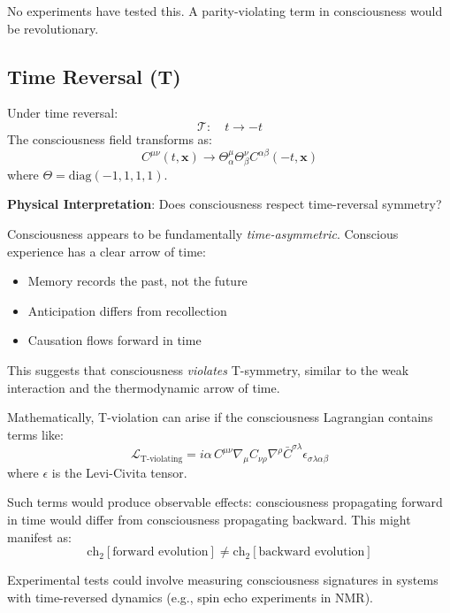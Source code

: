 No experiments have tested this. A parity-violating term in consciousness would be revolutionary.

\subsection{Time Reversal (T)}

\begin{definition}\label{def:t-symmetry-consciousness}
Under time reversal:
\begin{equation}
\mathcal{T}: \quad t \to -t
\end{equation}
The consciousness field transforms as:
\begin{equation}
C^{\mu\nu}(t, \mathbf{x}) \to \Theta^\mu_\alpha \Theta^\nu_\beta C^{\alpha\beta}(-t, \mathbf{x})
\end{equation}
where $\Theta = \text{diag}(-1, 1, 1, 1)$.
\end{definition}

\textbf{Physical Interpretation}: Does consciousness respect time-reversal symmetry?

\begin{level3}
Consciousness appears to be fundamentally \textit{time-asymmetric}. Conscious experience has a clear arrow of time:
\begin{itemize}
\item Memory records the past, not the future
\item Anticipation differs from recollection
\item Causation flows forward in time
\end{itemize}

This suggests that consciousness \textit{violates} T-symmetry, similar to the weak interaction and the thermodynamic arrow of time.

Mathematically, T-violation can arise if the consciousness Lagrangian contains terms like:
\begin{equation}
\mathcal{L}_{\text{T-violating}} = i \alpha \, C^{\mu\nu} \nabla_\mu C_{\nu\rho} \nabla^\rho \bar{C}^{\sigma\lambda} \epsilon_{\sigma\lambda\alpha\beta}
\end{equation}
where $\epsilon$ is the Levi-Civita tensor.

Such terms would produce observable effects: consciousness propagating forward in time would differ from consciousness propagating backward. This might manifest as:
\begin{equation}
\text{ch}_2[\text{forward evolution}] \neq \text{ch}_2[\text{backward evolution}]
\end{equation}

Experimental tests could involve measuring consciousness signatures in systems with time-reversed dynamics (e.g., spin echo experiments in NMR).
\end{level3}

